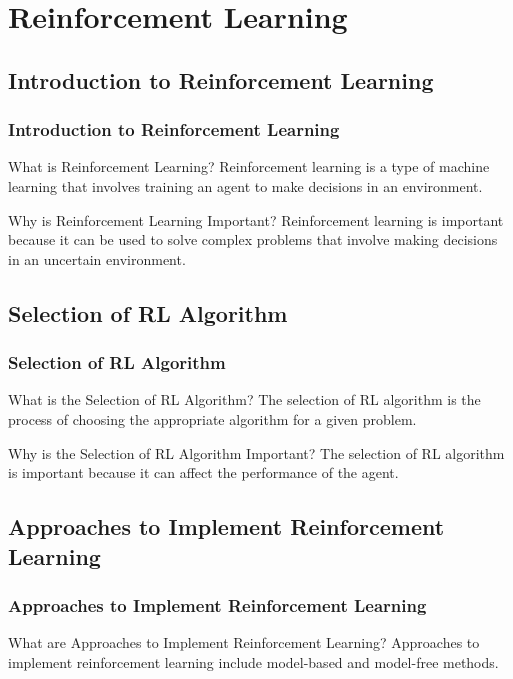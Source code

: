 \documentclass[aspectratio=169, hideothersubsections]{beamer}
\begin{document}
\section{Reinforcement Learning}

\subsection{Introduction to Reinforcement Learning}

\begin{frame}
  \frametitle{Introduction to Reinforcement Learning}
  \begin{block}{What is Reinforcement Learning?}
    Reinforcement learning is a type of machine learning that involves training an agent to make decisions in an environment.
  \end{block}
  \begin{block}{Why is Reinforcement Learning Important?}
    Reinforcement learning is important because it can be used to solve complex problems that involve making decisions in an uncertain environment.
  \end{block}
\end{frame}

\subsection{Selection of RL Algorithm}

\begin{frame}
  \frametitle{Selection of RL Algorithm}
  \begin{block}{What is the Selection of RL Algorithm?}
    The selection of RL algorithm is the process of choosing the appropriate algorithm for a given problem.
  \end{block}
  \begin{block}{Why is the Selection of RL Algorithm Important?}
    The selection of RL algorithm is important because it can affect the performance of the agent.
  \end{block}
\end{frame}

\subsection{Approaches to Implement Reinforcement Learning}

\begin{frame}
  \frametitle{Approaches to Implement Reinforcement Learning}
  \begin{block}{What are Approaches to Implement Reinforcement Learning?}
    Approaches to implement reinforcement learning include model-based and model-free methods.
  \end{block}
\end{frame}
\end{document}

